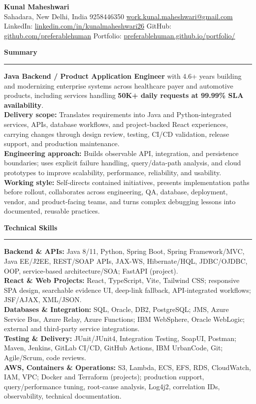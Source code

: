 \documentclass[11pt,letterpaper]{article}
\newcommand{\ressection}[1]{\Needspace{6\baselineskip}\vspace{8pt}\par\textbf{#1}\par\vspace{2pt}\hrule\vspace{5pt}}
\begin{document}
\pagestyle{empty}\raggedright\fontsize{11}{12.5}\selectfont

{\Large \textbf{Kunal Maheshwari}}\\
Sahadara, New Delhi, India \textbar{} 9258446350 \textbar{} \href{mailto:work.kunal.maheshwari@gmail.com}{work.kunal.maheshwari@gmail.com}\\
LinkedIn: \href{https://www.linkedin.com/in/kunalmaheshwari26}{linkedin.com/in/kunalmaheshwari26} \textbar{} GitHub: \href{https://github.com/preferablehuman}{github.com/preferablehuman} \textbar{} Portfolio: \href{https://preferablehuman.github.io/portfolio/}{preferablehuman.github.io/portfolio/}

\ressection{Summary}
\textbf{Java Backend / Product Application Engineer} with 4.6+ years building and modernizing enterprise systems across healthcare payer and automotive products, including services handling \textbf{50K+ daily requests at 99.99\% SLA availability}.\\[2pt]
\textbf{Delivery scope:} Translates requirements into Java and Python-integrated services, APIs, database workflows, and project-backed React experiences, carrying changes through design review, testing, CI/CD validation, release support, and production maintenance.\\[2pt]
\textbf{Engineering approach:} Builds observable API, integration, and persistence boundaries; uses explicit failure handling, query/data-path analysis, and cloud prototypes to improve scalability, performance, reliability, and usability.\\[2pt]
\textbf{Working style:} Self-directs contained initiatives, presents implementation paths before rollout, collaborates across engineering, QA, database, deployment, vendor, and product-facing teams, and turns complex debugging lessons into documented, reusable practices.

\ressection{Technical Skills}
\textbf{Backend \& APIs:} Java 8/11, Python, Spring Boot, Spring Framework/MVC, Java EE/J2EE, REST/SOAP APIs, JAX-WS, Hibernate/HQL, JDBC/OJDBC, OOP, service-based architecture/SOA; FastAPI (project).\\
\textbf{React \& Web Projects:} React, TypeScript, Vite, Tailwind CSS; responsive SPA design, searchable evidence UI, deep-link fallback, API-integrated workflows; JSF/AJAX, XML/JSON.\\
\textbf{Databases \& Integration:} SQL, Oracle, DB2, PostgreSQL; JMS, Azure Service Bus, Azure Relay, Azure Functions; IBM WebSphere, Oracle WebLogic; external and third-party service integrations.\\
\textbf{Testing \& Delivery:} JUnit/JUnit4, Integration Testing, SoapUI, Postman; Maven, Jenkins, GitLab CI/CD, GitHub Actions, IBM UrbanCode, Git; Agile/Scrum, code reviews.\\
\textbf{AWS, Containers \& Operations:} S3, Lambda, ECS, EFS, RDS, CloudWatch, IAM, VPC; Docker and Terraform (projects); production support, query/performance tuning, root-cause analysis, Log4j2, correlation IDs, observability, technical documentation.
\end{document}
